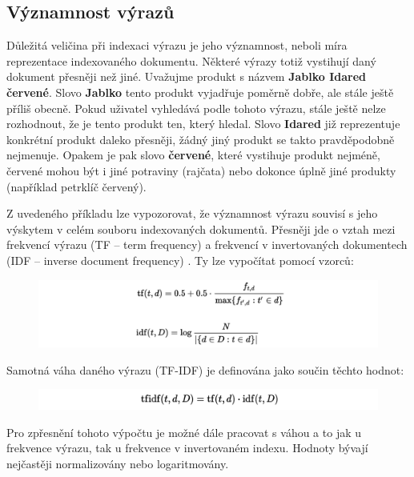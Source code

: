 \documentclass[FM,DP]{tulthesis}
\begin{document}
\subsection{Významnost výrazů}

Důležitá veličina při indexaci výrazu je jeho významnost, neboli míra reprezentace indexovaného
dokumentu. Některé výrazy totiž vystihují daný dokument přesněji než jiné. Uvažujme produkt
s názvem \textbf{Jablko Idared červené}. Slovo \textbf{Jablko} tento produkt vyjadřuje poměrně dobře, 
ale stále ještě příliš obecně. Pokud uživatel vyhledává podle tohoto výrazu, stále ještě nelze 
rozhodnout, že je tento produkt ten, který hledal. Slovo \textbf{Idared} již reprezentuje konkrétní
produkt daleko přesněji, žádný jiný produkt se takto pravděpodobně nejmenuje. Opakem je pak
slovo \textbf{červené}, které vystihuje produkt nejméně, červené mohou být i jiné potraviny (rajčata)
nebo dokonce úplně jiné produkty (například petrklíč červený). 

Z uvedeného příkladu lze vypozorovat, že významnost výrazu souvisí s jeho výskytem v celém
souboru indexovaných dokumentů. Přesněji jde o vztah mezi frekvencí výrazu (TF -- term frequency) 
a frekvencí v invertovaných dokumentech (IDF -- inverse document frequency) \cite[strana~21]{strossa}. 
Ty lze vypočítat pomocí vzorců:

\begin{figure}[h]
\center
\includegraphics[width=\textwidth]{tf-idf.png}
\end{figure}

Samotná váha daného výrazu (TF-IDF) je definována jako součin těchto hodnot:

\begin{figure}[h]
\center
\includegraphics[width=\textwidth]{tf-idf-2.png}
\end{figure}

Pro zpřesnění tohoto výpočtu je možné dále pracovat s váhou a to jak u frekvence výrazu, 
tak u frekvence v invertovaném indexu. Hodnoty bývají nejčastěji normalizovány nebo
logaritmovány.
\end{document}
